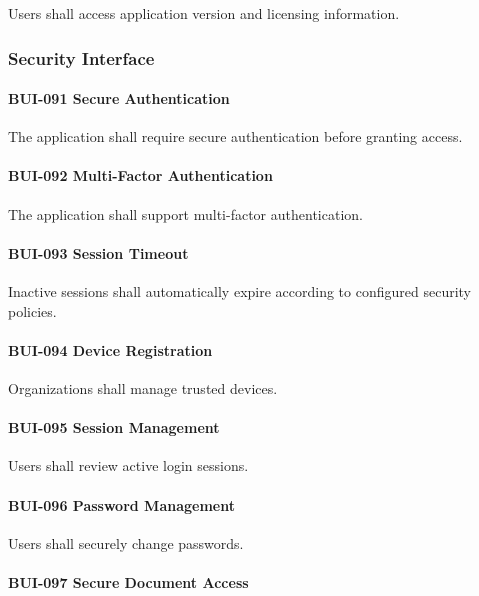 Users shall access application version and licensing information.


\subsubsection*{Security Interface}

\paragraph{BUI-091 Secure Authentication}

The application shall require secure authentication before granting
access.

\paragraph{BUI-092 Multi-Factor Authentication}

The application shall support multi-factor authentication.

\paragraph{BUI-093 Session Timeout}

Inactive sessions shall automatically expire according to configured
security policies.

\paragraph{BUI-094 Device Registration}

Organizations shall manage trusted devices.

\paragraph{BUI-095 Session Management}

Users shall review active login sessions.

\paragraph{BUI-096 Password Management}

Users shall securely change passwords.

\paragraph{BUI-097 Secure Document Access}

